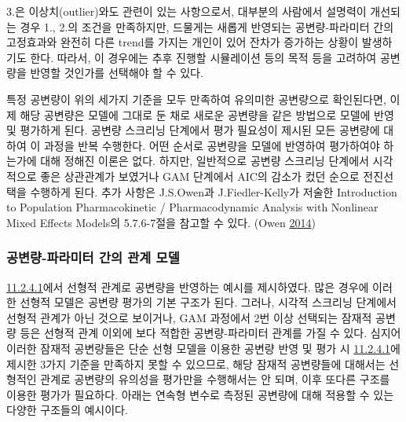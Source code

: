\documentclass[
  11pt,
  krantz2,
  a4paper]{krantz}
\theoremstyle{definition}
\theoremstyle{definition}
\theoremstyle{definition}
\theoremstyle{remark}
\begin{document}
3.은 이상치(outlier)와도 관련이 있는 사항으로서, 대부분의 사람에서 설명력이 개선되는 경우 1., 2.의 조건을 만족하지만, 드물게는 새롭게 반영되는 공변량-파라미터 간의 고정효과와 완전히 다른 trend를 가지는 개인이 있어 잔차가 증가하는 상황이 발생하기도 한다. 따라서, 이 경우에는 추후 진행할 시뮬레이션 등의 목적 등을 고려하여 공변량을 반영할 것인가를 선택해야 할 수 있다.

특정 공변량이 위의 세가지 기준을 모두 만족하여 유의미한 공변량으로 확인된다면, 이제 해당 공변량은 모델에 그대로 둔 채로 새로운 공변량을 같은 방법으로 모델에 반영 및 평가하게 된다. 공변량 스크리닝 단계에서 평가 필요성이 제시된 모든 공변량에 대하여 이 과정을 반복 수행한다. 어떤 순서로 공변량을 모델에 반영하여 평가하여야 하는가에 대해 정해진 이론은 없다. 하지만, 일반적으로 공변량 스크리닝 단계에서 시각적으로 좋은 상관관계가 보였거나 GAM 단계에서 AIC의 감소가 컸던 순으로 전진선택을 수행하게 된다. 추가 사항은 J.S.Owen과 J.Fiedler-Kelly가 저술한 Introduction to Population Pharmacokinetic / Pharmacodynamic Analysis with Nonlinear Mixed Effects Models의 5.7.6-7절을 참고할 수 있다. (Owen \protect\hyperlink{ref-kelly}{2014})

\hypertarget{cov-param}{%
\subsubsection{공변량-파라미터 간의 관계 모델}\label{cov-param}}

\protect\hyperlink{forward-sel-def}{11.2.4.1}에서 선형적 관계로 공변량을 반영하는 예시를 제시하였다. 많은 경우에 이러한 선형적 모델은 공변량 평가의 기본 구조가 된다. 그러나, 시각적 스크리닝 단계에서 선형적 관계가 아닌 것으로 보이거나, GAM 과정에서 2번 이상 선택되는 잠재적 공변량 등은 선형적 관계 이외에 보다 적합한 공변량-파라미터 관계를 가질 수 있다. 심지어 이러한 잠재적 공변량들은 단순 선형 모델을 이용한 공변량 반영 및 평가 시 \protect\hyperlink{forward-sel-def}{11.2.4.1}에 제시한 3가지 기준을 만족하지 못할 수 있으므로, 해당 잠재적 공변량들에 대해서는 선형적인 관계로 공변량의 유의성을 평가만을 수행해서는 안 되며, 이후 또다른 구조를 이용한 평가가 필요하다. 아래는 연속형 변수로 측정된 공변량에 대해 적용할 수 있는 다양한 구조들의 예시이다.
\end{document}
